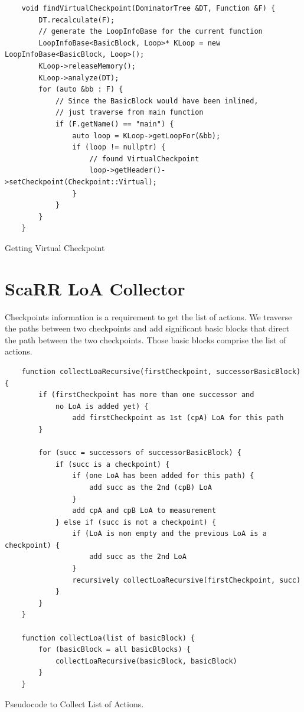 \begin{listing}[htbp]
    \begin{verbatim}
    void findVirtualCheckpoint(DominatorTree &DT, Function &F) {
        DT.recalculate(F);
        // generate the LoopInfoBase for the current function
        LoopInfoBase<BasicBlock, Loop>* KLoop = new LoopInfoBase<BasicBlock, Loop>();
        KLoop->releaseMemory();
        KLoop->analyze(DT);
        for (auto &bb : F) {
            // Since the BasicBlock would have been inlined, 
            // just traverse from main function
            if (F.getName() == "main") {
                auto loop = KLoop->getLoopFor(&bb);
                if (loop != nullptr) {
                    // found VirtualCheckpoint
                    loop->getHeader()->setCheckpoint(Checkpoint::Virtual);
                }
            }
        }
    }
    \end{verbatim}
    \caption{Getting Virtual Checkpoint}
    \label{listing:virtual-cp}
\end{listing}




\section{ScaRR LoA Collector}
\label{sec:scarr-loa-collector}

Checkpoints information is a requirement to get the list of actions.  We
traverse the paths between two checkpoints and add significant basic blocks that
direct the path between the two checkpoints. Those basic blocks comprise the
list of actions. 

\begin{listing}[t]
    \begin{verbatim}
    function collectLoaRecursive(firstCheckpoint, successorBasicBlock) {
        if (firstCheckpoint has more than one successor and 
            no LoA is added yet) {
                add firstCheckpoint as 1st (cpA) LoA for this path
        }
        
        for (succ = successors of successorBasicBlock) {
            if (succ is a checkpoint) {
                if (one LoA has been added for this path) {
                    add succ as the 2nd (cpB) LoA
                }
                add cpA and cpB LoA to measurement
            } else if (succ is not a checkpoint) {
                if (LoA is non empty and the previous LoA is a checkpoint) {
                    add succ as the 2nd LoA
                }
                recursively collectLoaRecursive(firstCheckpoint, succ)
            }
        }
    }

    function collectLoa(list of basicBlock) {
        for (basicBlock = all basicBlocks) {
            collectLoaRecursive(basicBlock, basicBlock)
        }
    }
    \end{verbatim}
    \caption{Pseudocode to Collect List of Actions.}
    \label{listing:loa-pseudocode}
\end{listing}

